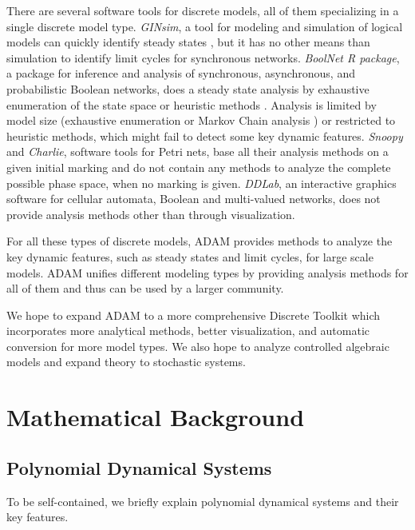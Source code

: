 \documentclass[11pt]{amsart}
\begin{document}
There are  several software tools for discrete models, all of them specializing in a single discrete model type.
{\it GINsim}, a tool for modeling and simulation of logical models can quickly identify steady states \cite{GINsim}, but it has no other means than simulation to identify limit cycles for synchronous networks. {\it BoolNet R package}, a package for inference and analysis of synchronous, asynchronous, and probabilistic Boolean networks, does a steady state analysis by exhaustive enumeration of the state space or heuristic methods \cite{boolnet}. Analysis is limited by model size (exhaustive enumeration or Markov Chain analysis ) or restricted to heuristic methods, which might fail to detect some key dynamic features. 
{\it Snoopy} and {\it Charlie}, software tools for Petri nets, base all their analysis methods on a given initial marking and do not contain any methods to analyze the complete possible phase space, when no marking is given.
{\it DDLab}, an interactive graphics software for cellular automata, Boolean and multi-valued networks, does not provide analysis methods other than through visualization. 
 
For all these types of discrete models, ADAM provides methods to analyze the key dynamic features, such as steady states and limit cycles, for large scale models. ADAM unifies different modeling types by providing analysis methods for all of them and thus can be used by a larger community. 

We hope to expand ADAM to a more comprehensive Discrete Toolkit which incorporates more
analytical methods, better visualization, and automatic conversion for more model types.
We also hope to analyze controlled algebraic models and expand theory to stochastic systems.


\appendix
\section{Mathematical Background}
\subsection{Polynomial Dynamical Systems}
To be self-contained, we briefly explain polynomial dynamical systems and their key features.
 
\end{document}
